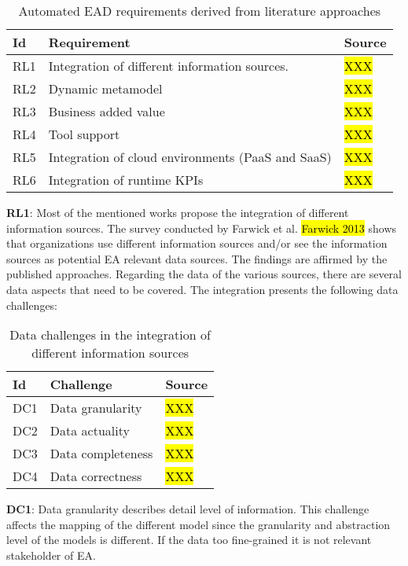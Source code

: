 \begin{table}[htpb]
  \caption[Automated EAD requirements derived from literature approaches]{Automated EAD requirements derived from literature approaches}\label{tab:literaturerequirements}
  \centering
  \begin{tabular}{l l l}
    \toprule
      Id & Requirement & Source\\
    \midrule
      RL1 & Integration of different information sources. & \hl{XXX}\\
      RL2 & Dynamic metamodel & \hl{XXX}\\
      RL3 & Business added value & \hl{XXX}\\
      RL4 & Tool support & \hl{XXX}\\
      RL5 & Integration of cloud environments (PaaS and SaaS) & \hl{XXX}\\
      RL6 & Integration of runtime KPIs & \hl{XXX}\\
    \bottomrule
  \end{tabular}
\end{table}

\textbf{RL1}: Most of the mentioned works propose the integration of different information sources. The survey conducted by Farwick et al. \hl{Farwick 2013} shows that organizations use different information sources and/or see the information sources as potential EA relevant data sources. The findings are affirmed by the published approaches.
Regarding the data of the various sources, there are several data aspects that need to be covered. The integration presents the following data challenges:

\begin{table}[htpb]
  \caption[Data challenges in the integration of different information sources]{Data challenges in the integration of different information sources}\label{tab:data-challenges}
  \centering
  \begin{tabular}{l l l}
    \toprule
      Id & Challenge & Source\\
    \midrule
      DC1 & Data granularity & \hl{XXX}\\
      DC2 & Data actuality & \hl{XXX}\\
      DC3 & Data completeness & \hl{XXX}\\
      DC4 & Data correctness & \hl{XXX}\\
    \bottomrule
  \end{tabular}
\end{table}
\textbf{DC1}: Data granularity describes detail level of information. This challenge affects the mapping of the different model since the granularity and abstraction level of the models is different. If the data too fine-grained it is not relevant stakeholder of EA.


